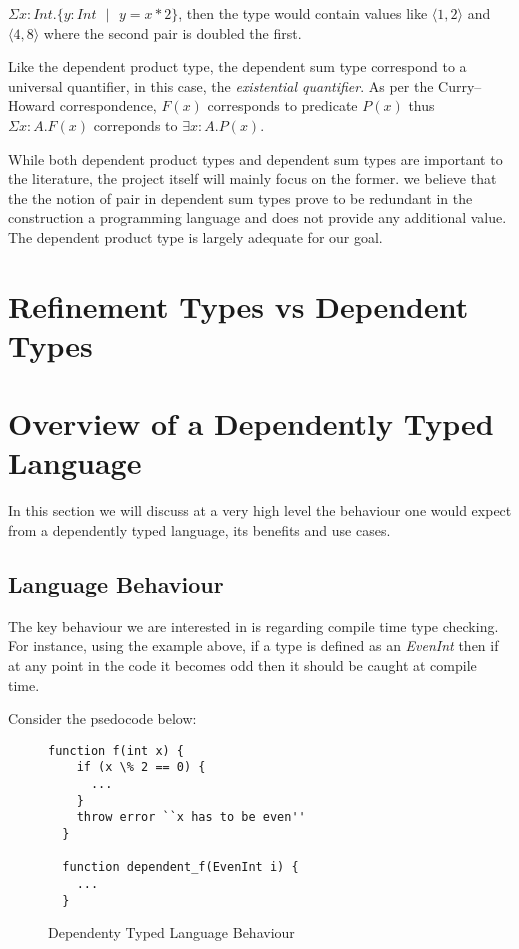 \documentclass[a4paper,12pt]{report}
\begin{document}
$\Sigma x: Int.\{y:Int\text{ }|\text{ } y = x * 2\}$, then the type would 
contain values like $\langle 1,2 \rangle$ and $\langle 4,8 \rangle$ where the 
second pair is doubled the first.

\par
Like the dependent product type, the dependent sum type correspond to a 
universal quantifier, in this case, the \textit{existential quantifier}. As 
per the Curry–Howard correspondence, $F(x)$ corresponds to predicate $P(x)$ 
thus $\Sigma x:A.F(x)$ correponds to $\exists x: A. P(x)$.

\par
While both dependent product types and dependent sum types are important to the 
literature, the project itself will mainly focus on the former. we believe that 
the the notion of pair in dependent sum types prove to be redundant in 
the construction a programming language and does not provide any additional 
value. The dependent product type is largely adequate for our goal.

\section{Refinement Types vs Dependent Types}

\section{Overview of a Dependently Typed Language}
In this section we will discuss at a very high level the behaviour one would 
expect from a dependently typed language, its benefits and use cases.

\subsection{Language Behaviour}
The key behaviour we are interested in is regarding compile time type checking. 
For instance, using the example above, if a type is defined as an \textit{EvenInt} 
then if at any point in the code it becomes odd then it should be caught at 
compile time. 

\par
Consider the psedocode below: 
\begin{figure}[H]
  \begin{lstlisting}[mathescape=true] 
  function f(int x) {
    if (x \% 2 == 0) {
      ...
    }
    throw error ``x has to be even''
  }
  
  function dependent_f(EvenInt i) {
    ...
  }
  \end{lstlisting}
  \caption{Dependenty Typed Language Behaviour}
\end{figure}
\end{document}
